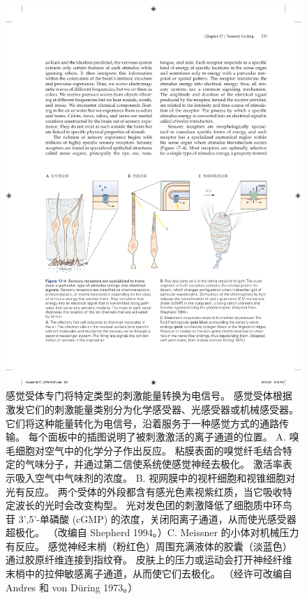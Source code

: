 \begin{figure}[htbp]
	\centering
	\includegraphics[width=1.0\linewidth]{chap17/fig_17_4}
	\caption{感觉受体专门将特定类型的刺激能量转换为电信号。 
		感觉受体根据激发它们的刺激能量类别分为化学感受器、光感受器或机械感受器。
		它们将这种能量转化为电信号，沿着服务于一种感觉方式的通路传输。
		每个面板中的插图说明了被刺激激活的离子通道的位置。
		A. 嗅毛细胞对空气中的化学分子作出反应。
		粘膜表面的嗅觉纤毛结合特定的气味分子，并通过第二信使系统使感觉神经去极化。
		激活率表示吸入空气中气味剂的浓度。
		B. 视网膜中的视杆细胞和视锥细胞对光有反应。
		两个受体的外段都含有感光色素视紫红质，当它吸收特定波长的光时会改变构型。
		光对发色团的刺激降低了细胞质中环鸟苷 3',5'-单磷酸 (cGMP) 的浓度，关闭阳离子通道，从而使光感受器超极化。
		（改编自 Shepherd 1994。）C. Meissner 的小体对机械压力有反应。 
		感觉神经末梢（粉红色）周围充满液体的胶囊（淡蓝色）通过胶原纤维连接到指纹脊。 皮肤上的压力或运动会打开神经纤维末梢中的拉伸敏感离子通道，从而使它们去极化。 （经许可改编自 Andres 和 von Düring 1973。）}
	\label{fig:17_4}
\end{figure}


